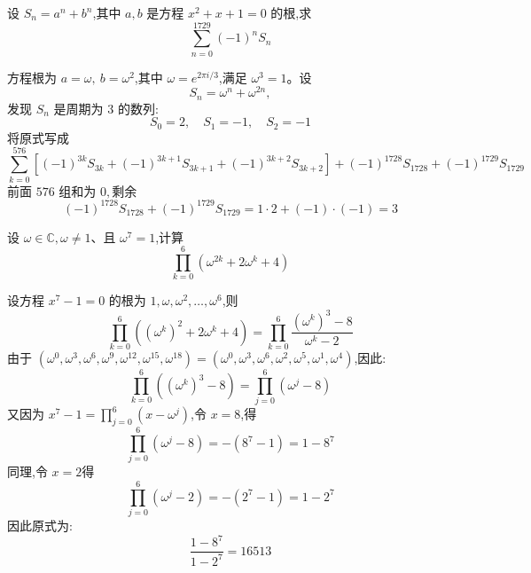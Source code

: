 \begin{questions}
    \question 设 \(S_n=a^n+b^n\),其中 \(a,b\) 是方程 \(x^2+x+1=0\) 的根,求
    \[
    \sum_{n=0}^{1729}(-1)^n S_n
    \]
    \begin{solution}
        方程根为 \(a = \omega,\ b = \omega^2\),其中 \(\omega = e^{2\pi i/3}\),满足 \(\omega^3 = 1\)。设 
        \[
        S_n = \omega^n + \omega^{2n},
        \]
        发现 \(S_n\) 是周期为 $3$ 的数列:
        \[
        S_0 = 2,\quad S_1 = -1,\quad S_2 = -1
        \]
        将原式写成
        \[
        \sum_{k=0}^{576} \left[(-1)^{3k} S_{3k} + (-1)^{3k+1} S_{3k+1} + (-1)^{3k+2} S_{3k+2}\right] + (-1)^{1728} S_{1728} + (-1)^{1729} S_{1729}
        \]
        前面 $576$ 组和为 $0,$剩余
        \[
        (-1)^{1728} S_{1728} + (-1)^{1729} S_{1729} = 1 \cdot 2 + (-1) \cdot (-1) = 3
        \]
    \end{solution}

    \question 设 \(\omega \in \mathbb{C},\omega \ne 1\)、且 \(\omega^7 = 1\),计算
    \[
    \prod_{k=0}^{6} (\omega^{2k} + 2\omega^k + 4)
    \]
    \begin{solution}
        设方程 \(x^7 - 1 = 0\) 的根为 \(1,\omega,\omega^2,\dots,\omega^6\),则
        \[
        \prod_{k=0}^{6} \left((\omega^k)^2 + 2\omega^k + 4\right)
        =\prod_{k=0}^{6} \frac{(\omega^k)^3 - 8}{\omega^k - 2}
        \]
        由于 $(\omega^0,\omega^3,\omega^6,\omega^9,\omega^{12},\omega^{15},\omega^{18})=(\omega^0,\omega^3,\omega^6,\omega^2,\omega^{5},\omega^{1},\omega^{4})$,因此:
        \[
        \prod_{k=0}^{6} ((\omega^k)^3 - 8) = \prod_{j=0}^{6} (\omega^j - 8)
        \]
        又因为 \(x^7 - 1 = \prod_{j=0}^{6} (x - \omega^j)\),令 \(x = 8\),得
        \[
        \prod_{j=0}^{6} (\omega^j - 8) = -(8^7 - 1) = 1 - 8^7
        \]
        同理,令 \(x = 2\)得
        \[
        \prod_{j=0}^{6} (\omega^j - 2) = -(2^7 - 1) = 1 - 2^7
        \]
        因此原式为:
        \[
        \frac{1 - 8^7}{1 - 2^7}=16513
        \]
    \end{solution}


\end{questions}
